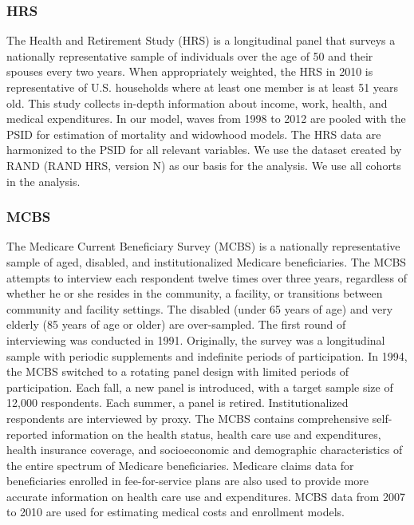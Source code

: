 \subsubsection{HRS}

\noindent The Health and Retirement Study (HRS) is a longitudinal panel that surveys a nationally representative sample of individuals over the age of 50 and their spouses every two years.  When appropriately weighted, the HRS in 2010 is representative of U.S. households 
where at least one member is at least 51 years old.
This study collects in-depth information about income, work, health, and medical expenditures. In our model, waves from 1998 to 2012 are pooled with the PSID for estimation of mortality and 
widowhood models. The HRS data
are harmonized to the PSID for all relevant variables. We use the dataset created by RAND (RAND HRS, version N) as our basis 
for the analysis. We use all cohorts in the analysis. \\

\subsubsection{MCBS}
\noindent The Medicare Current Beneficiary Survey (MCBS) is a nationally representative sample of aged, disabled, 
and institutionalized Medicare beneficiaries.  The MCBS attempts to interview each respondent twelve 
times over three years, regardless of whether he or she resides in the community, a facility, or 
transitions between community and facility settings. The disabled (under 65 years of age) and 
very elderly (85 years of age or older) are over-sampled. The first round of interviewing was conducted 
in 1991. Originally, the survey was a longitudinal sample with periodic supplements and indefinite 
periods of participation. In 1994, the MCBS switched to a rotating panel design with limited periods 
of participation. Each fall, a new panel is introduced, with a target sample size of 12,000 respondents. Each summer, a panel is retired. Institutionalized respondents are interviewed by proxy.  The MCBS 
contains comprehensive self-reported information on the health status, health care use and 
expenditures, health insurance coverage, and socioeconomic and demographic characteristics of the 
entire spectrum of Medicare beneficiaries.  Medicare claims data for beneficiaries enrolled in 
fee-for-service plans are also used to provide more accurate information on health care use and 
expenditures.  MCBS data from 2007 to 2010 are used for estimating medical costs and enrollment models. \\

